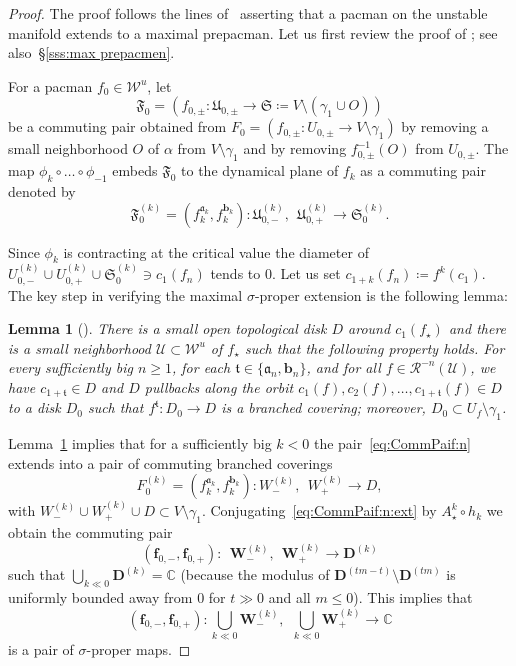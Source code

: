\documentclass{amsart}
\renewcommand{\sp}{{\ \ }}
\newcommand{\1}{{\mathbb 1 }}
\newcommand\RR{\mathcal{R}}
\newcommand{\bW}{{\mathbf W}}
\newcommand{\bD}{{\mathbf D}}
\newcommand{\bbf}{{\mathbf f}}
\newcommand{\str}{{\star}}
\renewcommand{\aa}{\mathfrak{a}}
\newcommand{\bb}{{\mathbf b}}
\renewcommand{\tt}{\mathfrak{t}}
\newcommand\WW{\mathcal{W}}
\newcommand\UU{\mathcal{U}}
\newcommand{\C}{\mathbb{C}}
\newtheorem{lem}[thm]{Lemma}
\theoremstyle{remark}
\numberwithin{equation}{section}
\theoremstyle{definition}
\theoremstyle{nonumberbreak}
\begin{document}
\begin{proof}
The proof follows the lines of~\cite[Theorem 5.5]{DLS} asserting that a pacman on the unstable manifold extends to a maximal prepacman. Let us first review the proof of \cite[Theorem 5.5]{DLS}; see also~\S\ref{sss:max prepacmen}.





For a pacman $f_0\in \WW^u$, let 
\[\mathfrak F_0 =\left(f_{0, \pm } \colon \mathfrak U_{0,\pm} \to \mathfrak S \coloneqq V\setminus (\gamma_1\cup O)\right)\] 
be a commuting pair obtained from $F_{0} = \left(f_{0, \pm } \colon U_{0,\pm}\to V\setminus \gamma_1\right)$ by removing a small neighborhood $O$ of $\alpha$ from $ V\setminus \gamma_1$ and by removing $f_{0,\pm}^{-1}(O)$ from $  U_{0,\pm}$. The map
$\phi_{k}\circ   \dots\circ \phi_{-1}$ embeds $\mathfrak F_0$ to the dynamical plane of $f_k$ as a commuting pair denoted by
\begin{equation}
\label{eq:CommPaif:n}
\mathfrak F^{(k)}_0 =\left( f_k^{\aa_{k}},f^{\bb_{k}}_k \right)\colon \mathfrak U^{(k)}_{0,-} ,\sp \mathfrak U^{(k)}_{0,+} \to  \mathfrak S_0^{(k)}.
\end{equation}


Since $\phi_{k}$ is contracting at the critical value the diameter of $U^{(k)}_{0,-} \cup U^{(k)}_{0,+}\cup  \mathfrak S^{(k)}_{0}\ni c_1(f_n)$ tends to $0$. Let us set $c_{1+k}(f_n)\coloneqq f^k(c_1)$. The key step in verifying the maximal $\sigma$-proper extension is the following lemma:

\begin{lem}[{\cite[Key Lemma 4.8]{DLS}}]
\label{lem:KeyLemma}
There is a small open topological disk $D$ around $c_1(f_\str)$ and there is a small neighborhood $\UU\subset \WW^u$ of $f_\str$ such that the following property holds. For every sufficiently big $n\ge 1$, for each $\tt\in \{\aa_n,\bb_n\}$, and for all $f\in \RR^{-n} (\UU)$, we have ${c_{1+\tt}\in D
}$ and $D$ pullbacks along the orbit $c_1(f), c_2(f),\dots , c_{1+\tt}(f)\in D$ to a disk $D_{0}$ such that $f^{\tt}\colon D_{0} \to D$ is a branched covering; moreover, $D_0\subset U_{f}\setminus \gamma_1$.
\end{lem}


Lemma~\ref{lem:KeyLemma} implies that for a sufficiently big $k<0$ the pair~\eqref{eq:CommPaif:n} extends into a pair of commuting branched coverings
\begin{equation}
\label{eq:CommPaif:n:ext}
F^{(k)}_0 =\left( f_{k}^{\aa_k},f^{\bb_k}_{k} \right)\colon  W_{-}^{(k)} ,\sp   W^{(k)}_{+} \to D,
\end{equation} with $W_{-}^{(k)} \cup   W^{(k)}_{+} \cup D\subset V\setminus \gamma_1$. Conjugating~\eqref{eq:CommPaif:n:ext} by $A_\str^k\circ h_k$ we obtain the commuting pair  
\[(\bbf_{0,-},\bbf_{0,+}) \colon\sp   \bW^{(k)}_{-} ,\sp   \bW^{(k)}_{+} \to \bD^{(k)}\]
such that $\displaystyle{\bigcup_{k\ll 0} \bD^{(k)} =\C}$ (because the modulus of $\bD^{(tm-t)} \setminus \bD^{(tm)}$ is uniformly bounded away from $0$ for $t\gg 0$ and all $m\le 0$). This implies that
\[(\bbf_{0,-},\bbf_{0,+}) \colon  \bigcup_{k\ll 0}\bW^{(k)}_{-} ,\sp   \bigcup_{k\ll 0}   \bW^{(k)}_{+} \to \C\] is a pair of $\sigma$-proper maps. 



\end{proof}
\end{document}
